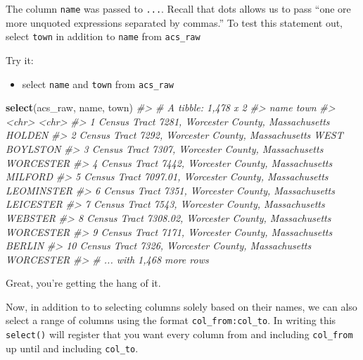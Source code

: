 \documentclass[
]{book}
\newenvironment{Shaded}{\begin{snugshade}}{\end{snugshade}}
\newcommand{\CommentTok}[1]{\textcolor[rgb]{0.56,0.35,0.01}{\textit{#1}}}
\newcommand{\KeywordTok}[1]{\textcolor[rgb]{0.13,0.29,0.53}{\textbf{#1}}}
\newcommand{\NormalTok}[1]{#1}
\providecommand{\tightlist}{%
  \setlength{\itemsep}{0pt}\setlength{\parskip}{0pt}}
\begin{document}
The column \texttt{name} was passed to \texttt{...}. Recall that dots allows us to pass ``one ore more unquoted expressions separated by commas.'' To test this statement out, select \texttt{town} in addition to \texttt{name} from \texttt{acs\_raw}

Try it:

\begin{itemize}
\tightlist
\item
  select \texttt{name} and \texttt{town} from \texttt{acs\_raw}
\end{itemize}

\begin{Shaded}
\begin{Highlighting}[]
\KeywordTok{select}\NormalTok{(acs\_raw, name, town)}
\CommentTok{\#\textgreater{} \# A tibble: 1,478 x 2}
\CommentTok{\#\textgreater{}    name                                                  town         }
\CommentTok{\#\textgreater{}    \textless{}chr\textgreater{}                                                 \textless{}chr\textgreater{}        }
\CommentTok{\#\textgreater{}  1 Census Tract 7281, Worcester County, Massachusetts    HOLDEN       }
\CommentTok{\#\textgreater{}  2 Census Tract 7292, Worcester County, Massachusetts    WEST BOYLSTON}
\CommentTok{\#\textgreater{}  3 Census Tract 7307, Worcester County, Massachusetts    WORCESTER    }
\CommentTok{\#\textgreater{}  4 Census Tract 7442, Worcester County, Massachusetts    MILFORD      }
\CommentTok{\#\textgreater{}  5 Census Tract 7097.01, Worcester County, Massachusetts LEOMINSTER   }
\CommentTok{\#\textgreater{}  6 Census Tract 7351, Worcester County, Massachusetts    LEICESTER    }
\CommentTok{\#\textgreater{}  7 Census Tract 7543, Worcester County, Massachusetts    WEBSTER      }
\CommentTok{\#\textgreater{}  8 Census Tract 7308.02, Worcester County, Massachusetts WORCESTER    }
\CommentTok{\#\textgreater{}  9 Census Tract 7171, Worcester County, Massachusetts    BERLIN       }
\CommentTok{\#\textgreater{} 10 Census Tract 7326, Worcester County, Massachusetts    WORCESTER    }
\CommentTok{\#\textgreater{} \# ... with 1,468 more rows}
\end{Highlighting}
\end{Shaded}

Great, you're getting the hang of it.

Now, in addition to to selecting columns solely based on their names, we can also select a range of columns using the format \texttt{col\_from:col\_to}. In writing this \texttt{select()} will register that you want every column from and including \texttt{col\_from} up until and including \texttt{col\_to}.
\end{document}
